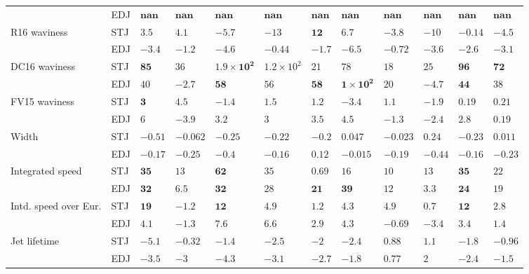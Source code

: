 \begin{tabular}{l}
 & EDJ & $\mathbf{nan}$ & $\mathbf{nan}$ & $\mathbf{nan}$ & $\mathbf{nan}$ & $\mathbf{nan}$ & $\mathbf{nan}$ & $\mathbf{nan}$ & $\mathbf{nan}$ & $\mathbf{nan}$ & $\mathbf{nan}$ \\
R16 waviness & STJ & ${3.5}$ & ${4.1}$ & ${-5.7}$ & ${-13}$ & $\mathbf{12}$ & ${6.7}$ & ${-3.8}$ & ${-10}$ & ${-0.14}$ & ${-4.5}$ \\
 & EDJ & ${-3.4}$ & ${-1.2}$ & ${-4.6}$ & ${-0.44}$ & ${-1.7}$ & ${-6.5}$ & ${-0.72}$ & ${-3.6}$ & ${-2.6}$ & ${-3.1}$ \\
DC16 waviness & STJ & $\mathbf{85}$ & ${36}$ & $\mathbf{1.9 \times 10^{2}}$ & ${1.2 \times 10^{2}}$ & ${21}$ & ${78}$ & ${18}$ & ${25}$ & $\mathbf{96}$ & $\mathbf{72}$ \\
 & EDJ & ${40}$ & ${-2.7}$ & $\mathbf{58}$ & ${56}$ & $\mathbf{58}$ & $\mathbf{1 \times 10^{2}}$ & ${20}$ & ${-4.7}$ & $\mathbf{44}$ & ${38}$ \\
FV15 waviness & STJ & $\mathbf{3}$ & ${4.5}$ & ${-1.4}$ & ${1.5}$ & ${1.2}$ & ${-3.4}$ & ${1.1}$ & ${-1.9}$ & ${0.19}$ & ${0.21}$ \\
 & EDJ & ${6}$ & ${-3.9}$ & ${3.2}$ & ${3}$ & ${3.5}$ & ${4.5}$ & ${-1.3}$ & ${-2.4}$ & ${2.8}$ & ${0.19}$ \\
Width & STJ & $\mathbf{-0.51}$ & ${-0.062}$ & ${-0.25}$ & ${-0.22}$ & ${-0.2}$ & ${0.047}$ & ${-0.023}$ & ${0.24}$ & $\mathbf{-0.23}$ & ${0.011}$ \\
 & EDJ & ${-0.17}$ & ${-0.25}$ & $\mathbf{-0.4}$ & ${-0.16}$ & ${0.12}$ & ${-0.015}$ & ${-0.19}$ & $\mathbf{-0.44}$ & ${-0.16}$ & ${-0.23}$ \\
Integrated speed & STJ & $\mathbf{35}$ & ${13}$ & $\mathbf{62}$ & ${35}$ & ${0.69}$ & ${16}$ & ${10}$ & ${13}$ & $\mathbf{35}$ & ${22}$ \\
 & EDJ & $\mathbf{32}$ & ${6.5}$ & $\mathbf{32}$ & ${28}$ & $\mathbf{21}$ & $\mathbf{39}$ & ${12}$ & ${3.3}$ & $\mathbf{24}$ & ${19}$ \\
Intd. speed over Eur. & STJ & $\mathbf{19}$ & ${-1.2}$ & $\mathbf{12}$ & ${4.9}$ & ${1.2}$ & ${4.3}$ & ${4.9}$ & ${0.7}$ & $\mathbf{12}$ & ${2.8}$ \\
 & EDJ & ${4.1}$ & ${-1.3}$ & $\mathbf{7.6}$ & ${6.6}$ & ${2.9}$ & ${4.3}$ & ${-0.69}$ & ${-3.4}$ & $\mathbf{3.4}$ & ${1.4}$ \\
Jet lifetime & STJ & ${-5.1}$ & ${-0.32}$ & ${-1.4}$ & ${-2.5}$ & ${-2}$ & ${-2.4}$ & ${0.88}$ & ${1.1}$ & ${-1.8}$ & ${-0.96}$ \\
 & EDJ & ${-3.5}$ & ${-3}$ & $\mathbf{-4.3}$ & ${-3.1}$ & ${-2.7}$ & ${-1.8}$ & ${0.77}$ & ${2}$ & $\mathbf{-2.4}$ & ${-1.5}$ \\

\end{tabular}
